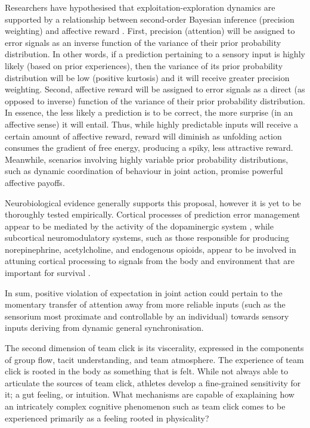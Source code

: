 \begin{CJK}{UTF8}{gbsn}
Researchers have hypothesised that exploitation-exploration dynamics are supported by a relationship between second-order Bayesian inference (precision weighting) and affective reward  \citep{Friston2012,Chetverikov2016}.  First, precision (attention) will be assigned to error signals as an inverse function of the variance of their prior probability distribution.  In other words, if a prediction pertaining to a sensory input is highly likely (based on prior experiences), then the variance of its prior probability distribution will be low (positive kurtosis) and it will receive greater precision weighting.  Second, affective reward will be assigned to error signals as a direct (as opposed to inverse) function of the variance of their prior probability distribution. In essence, the less likely a prediction is to be correct, the more surprise (in an affective sense) it will entail.  Thus, while highly predictable inputs will receive a certain amount of affective reward, reward will diminish as unfolding action consumes the gradient of free energy, producing a spiky, less attractive reward.  Meanwhile, scenarios involving highly variable prior probability distributions, such as dynamic coordination of behaviour in joint action, promise powerful affective payoffs.

Neurobiological evidence generally supports this proposal, however it is yet to be thoroughly tested empirically.  Cortical processes of prediction error management appear to be mediated by the activity of the dopaminergic system \citep{Kakade2002,Schultz2016}, while subcortical neuromodulatory systems, such as those responsible for producing norepinephrine, acetylcholine, and endogenous opioids, appear to be involved in attuning cortical processing to signals from the body and environment that are important for survival \citep{Lewis2005}.

In sum, positive violation of expectation in joint action could pertain to the momentary transfer of attention away from more reliable inputs (such as the sensorium most proximate and controllable by an individual) towards sensory inputs deriving from dynamic general synchronisation.


The second dimension of team click is its viscerality, expressed in the components of group flow, tacit understanding, and team atmosphere.  The experience of team click is rooted in the body as something that is felt.  While not always able to articulate the sources of team click, athletes develop a fine-grained sensitivity for it; a gut feeling, or intuition.  What mechanisms are capable of exaplaining how an intricately complex cognitive phenomenon such as team click comes to be experienced primarily as a feeling rooted in physicality?


\end{CJK}
